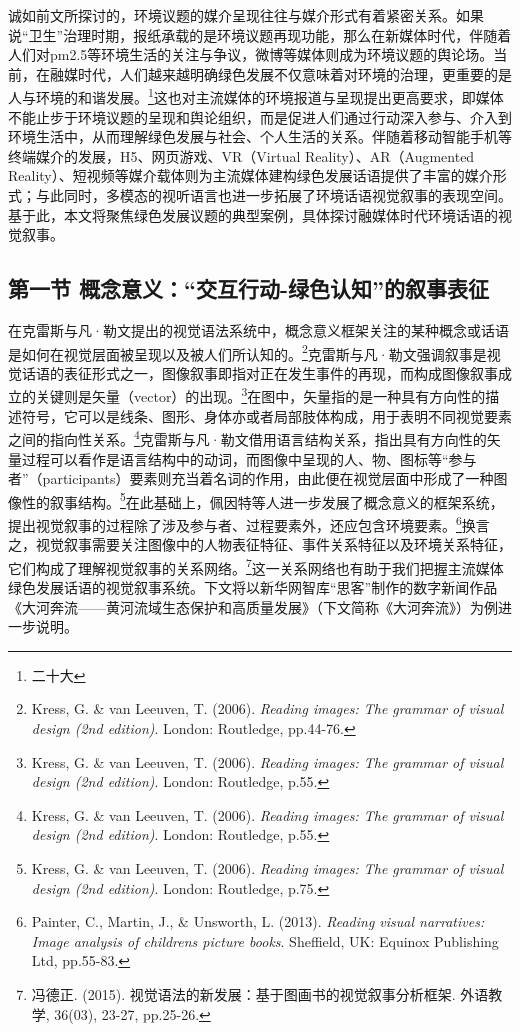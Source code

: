 诚如前文所探讨的，环境议题的媒介呈现往往与媒介形式有着紧密关系。如果说``卫生''治理时期，报纸承载的是环境议题再现功能，那么在新媒体时代，伴随着人们对pm2.5等环境生活的关注与争议，微博等媒体则成为环境议题的舆论场。当前，在融媒时代，人们越来越明确绿色发展不仅意味着对环境的治理，更重要的是人与环境的和谐发展。\footnote{二十大}这也对主流媒体的环境报道与呈现提出更高要求，即媒体不能止步于环境议题的呈现和舆论组织，而是促进人们通过行动深入参与、介入到环境生活中，从而理解绿色发展与社会、个人生活的关系。伴随着移动智能手机等终端媒介的发展，H5、网页游戏、VR（Virtual
Reality）、AR（Augmented
Reality）、短视频等媒介载体则为主流媒体建构绿色发展话语提供了丰富的媒介形式；与此同时，多模态的视听语言也进一步拓展了环境话语视觉叙事的表现空间。基于此，本文将聚焦绿色发展议题的典型案例，具体探讨融媒体时代环境话语的视觉叙事。

\subsection{第一节
概念意义：``交互行动-绿色认知''的叙事表征}\label{ux7b2cux4e00ux8282-ux6982ux5ff5ux610fux4e49ux4ea4ux4e92ux884cux52a8-ux7effux8272ux8ba4ux77e5ux7684ux53d9ux4e8bux8868ux5f81}

在克雷斯与凡·勒文提出的视觉语法系统中，概念意义框架关注的某种概念或话语是如何在视觉层面被呈现以及被人们所认知的。\footnote{Kress,
  G. \& van Leeuven, T. (2006). \emph{Reading images: The grammar of
  visual design (2nd edition)}. London: Routledge, pp.44-76.}克雷斯与凡·勒文强调叙事是视觉话语的表征形式之一，图像叙事即指对正在发生事件的再现，而构成图像叙事成立的关键则是矢量（vector）的出现。\footnote{Kress,
  G. \& van Leeuven, T. (2006). \emph{Reading images: The grammar of
  visual design (2nd edition)}. London: Routledge, p.55.}在图中，矢量指的是一种具有方向性的描述符号，它可以是线条、图形、身体亦或者局部肢体构成，用于表明不同视觉要素之间的指向性关系。\footnote{Kress,
  G. \& van Leeuven, T. (2006). \emph{Reading images: The grammar of
  visual design (2nd edition)}. London: Routledge, p.55.}克雷斯与凡·勒文借用语言结构关系，指出具有方向性的矢量过程可以看作是语言结构中的动词，而图像中呈现的人、物、图标等``参与者''（participants）要素则充当着名词的作用，由此便在视觉层面中形成了一种图像性的叙事结构。\footnote{Kress,
  G. \& van Leeuven, T. (2006). \emph{Reading images: The grammar of
  visual design (2nd edition)}. London: Routledge, p.75.}在此基础上，佩因特等人进一步发展了概念意义的框架系统，提出视觉叙事的过程除了涉及参与者、过程要素外，还应包含环境要素。\footnote{Painter,
  C., Martin, J., \& Unsworth, L. (2013). \emph{Reading visual
  narratives: Image analysis of children\textquotesingle s picture
  books}. Sheffield, UK: Equinox Publishing Ltd, pp.55-83.}换言之，视觉叙事需要关注图像中的人物表征特征、事件关系特征以及环境关系特征，它们构成了理解视觉叙事的关系网络。\footnote{冯德正.
  (2015). 视觉语法的新发展：基于图画书的视觉叙事分析框架. 外语教学,
  36(03), 23-27, pp.25-26.}这一关系网络也有助于我们把握主流媒体绿色发展话语的视觉叙事系统。下文将以新华网智库``思客''制作的数字新闻作品《大河奔流------黄河流域生态保护和高质量发展》（下文简称《大河奔流》）为例进一步说明。


